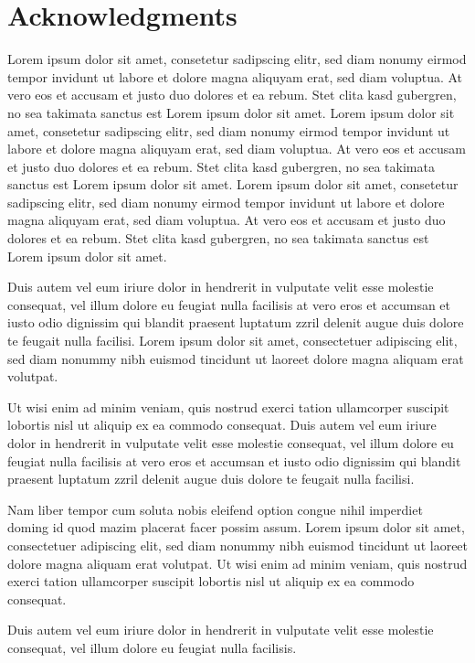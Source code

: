 \chapter*{Acknowledgments}
Lorem ipsum dolor sit amet, consetetur sadipscing elitr,  sed diam nonumy eirmod
tempor invidunt ut labore et dolore magna aliquyam erat, sed diam voluptua. At
vero eos et accusam et justo duo dolores et ea rebum. Stet clita kasd gubergren,
no sea takimata sanctus est Lorem ipsum dolor sit amet. Lorem ipsum dolor sit
amet, consetetur sadipscing elitr,  sed diam nonumy eirmod tempor invidunt ut
labore et dolore magna aliquyam erat, sed diam voluptua. At vero eos et accusam
et justo duo dolores et ea rebum. Stet clita kasd gubergren, no sea takimata
sanctus est Lorem ipsum dolor sit amet. Lorem ipsum dolor sit amet, consetetur
sadipscing elitr,  sed diam nonumy eirmod tempor invidunt ut labore et dolore
magna aliquyam erat, sed diam voluptua. At vero eos et accusam et justo duo
dolores et ea rebum. Stet clita kasd gubergren, no sea takimata sanctus est
Lorem ipsum dolor sit amet.

Duis autem vel eum iriure dolor in hendrerit in vulputate velit esse molestie
consequat, vel illum dolore eu feugiat nulla facilisis at vero eros et accumsan
et iusto odio dignissim qui blandit praesent luptatum zzril delenit augue duis
dolore te feugait nulla facilisi. Lorem ipsum dolor sit amet, consectetuer
adipiscing elit, sed diam nonummy nibh euismod tincidunt ut laoreet dolore
magna aliquam erat volutpat.

Ut wisi enim ad minim veniam, quis nostrud exerci tation ullamcorper suscipit
lobortis nisl ut aliquip ex ea commodo consequat. Duis autem vel eum iriure
dolor in hendrerit in vulputate velit esse molestie consequat, vel illum dolore
eu feugiat nulla facilisis at vero eros et accumsan et iusto odio dignissim qui
blandit praesent luptatum zzril delenit augue duis dolore te feugait nulla
facilisi.

Nam liber tempor cum soluta nobis eleifend option congue nihil imperdiet doming
id quod mazim placerat facer possim assum. Lorem ipsum dolor sit amet,
consectetuer adipiscing elit, sed diam nonummy nibh euismod tincidunt ut laoreet
dolore magna aliquam erat volutpat. Ut wisi enim ad minim veniam, quis nostrud
exerci tation ullamcorper suscipit lobortis nisl ut aliquip ex ea commodo
consequat.

Duis autem vel eum iriure dolor in hendrerit in vulputate velit esse molestie
consequat, vel illum dolore eu feugiat nulla facilisis.

